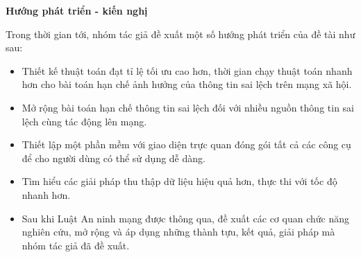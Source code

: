 \textbf{Hướng phát triển - kiến nghị} 

Trong thời gian tới, nhóm tác giả đề xuất một số hướng phát triển của đề tài như sau:

\begin{itemize}
	\item Thiết kế thuật toán đạt tỉ lệ tối ưu cao hơn, thời gian chạy thuật toán nhanh hơn cho bài toán hạn chế ảnh hưởng của thông tin sai lệch trên mạng xã hội.
	
	\item Mở rộng bài toán hạn chế thông tin sai lệch đối với nhiều nguồn thông tin sai lệch cùng tác động lên mạng.
	
	\item Thiết lập một phần mềm với giao diện trực quan đóng gói tất cả các công cụ để cho người dùng có thể sử dụng dễ dàng.
	
	\item Tìm hiểu các giải pháp thu thập dữ liệu hiệu quả hơn, thực thi với tốc độ nhanh hơn.
	
	\item Sau khi Luật An ninh mạng được thông qua, đề xuất các cơ quan chức năng nghiên cứu, mở rộng và áp dụng những thành tựu, kết quả, giải pháp mà nhóm tác giả đã đề xuất.
\end{itemize}

